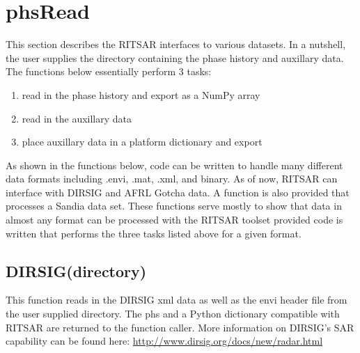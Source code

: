 \documentclass{article}
\begin{document}
\section{phsRead}
This section describes the RITSAR interfaces to various datasets.  In a nutshell, the user supplies the directory containing the phase history and auxillary data.  The functions below essentially perform 3 tasks:
\begin{enumerate}
\item read in the phase history and export as a NumPy array
\item read in the auxillary data
\item place auxillary data in a platform dictionary and export
\end{enumerate}
As shown in the functions below, code can be written to handle many different data formats including .envi, .mat, .xml, and binary.  As of now, RITSAR can interface with DIRSIG and AFRL Gotcha data.  A function is also provided that processes a Sandia data set.  These functions serve mostly to show that data in almost any format can be processed with the RITSAR toolset provided code is written that performs the three tasks listed above for a given format.


\subsection{DIRSIG(directory)}
This function reads in the DIRSIG xml data as well as the envi header file from the user supplied directory. The phs and a Python dictionary compatible with RITSAR are returned to the function caller.  More information on DIRSIG's SAR capability can be found here: \url{http://www.dirsig.org/docs/new/radar.html}\\
\end{document}
